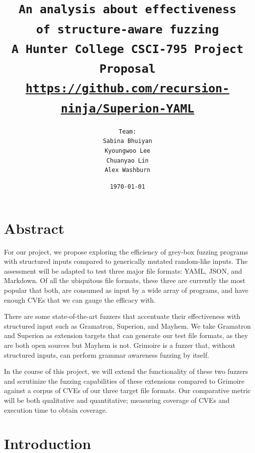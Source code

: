 \documentclass[12pt]{diazessay}
\title{\texttt{\huge{An analysis about effectiveness\\\vspace{-3mm}of structure-aware fuzzing} \\\vspace{-0.35cm} {\large A Hunter College CSCI-795 Project Proposal}\\\normalsize\url{https://github.com/recursion-ninja/Superion-YAML}}} %
\author{\texttt{{\Huge Team:}\\\vspace*{-0.5em} 
		Sabina Bhuiyan \\\vspace*{-0.5em} 
		Kyoungwoo Lee \\\vspace*{-0.5em}
		Chuanyao Lin \\\vspace*{-0.25em}
		Alex Washburn}} %
\date{\texttt{\today}} %
\begin{document}
\maketitle %

\vspace{2cm}
\section*{Abstract}


For our project, we propose exploring the efficiency of grey-box fuzzing programs with structured inputs compared to generically mutated random-like inputs.
The assessment will be adapted to test three major file formats: YAML, JSON, and Markdown.
Of all the ubiquitous file formats, these three are currently the most popular that both, are consumed as input by a wide array of programs, and have enough CVEs that we can gauge the efficacy with.

There are some state-of-the-art fuzzers that accentuate their effectiveness with structured input such as Gramatron, Superion, and Mayhem.
We take Gramatron and Superion as extension targets that can generate our test file formats, as they are both open sources but Mayhem is not.
Grimoire is a fuzzer that, without structured inputs, can perform grammar awareness fuzzing by itself.

In the course of this project, we will extend the functionality of these two fuzzers and scrutinize the fuzzing capabilities of these extensions compared to Grimoire against a corpus of CVEs of our three target file formats.
Our comparative metric will be both qualitative and quantitative; measuring coverage of CVEs and execution time to obtain coverage.


\clearpage

\section*{Introduction}
\end{document}
